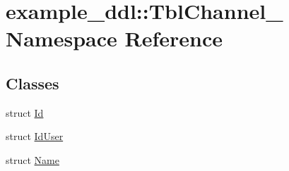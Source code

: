 \hypertarget{namespaceexample__ddl_1_1TblChannel__}{}\section{example\+\_\+ddl\+:\+:Tbl\+Channel\+\_\+ Namespace Reference}
\label{namespaceexample__ddl_1_1TblChannel__}
\subsection*{Classes}
\begin{DoxyCompactItemize}
\item 
struct \hyperlink{structexample__ddl_1_1TblChannel___1_1Id}{Id}
\item 
struct \hyperlink{structexample__ddl_1_1TblChannel___1_1IdUser}{Id\+User}
\item 
struct \hyperlink{structexample__ddl_1_1TblChannel___1_1Name}{Name}
\end{DoxyCompactItemize}
